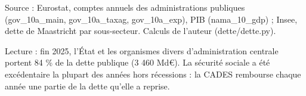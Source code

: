 Source : Eurostat, comptes annuels des administrations publiques (gov\_10a\_main, gov\_10a\_taxag, gov\_10a\_exp), PIB (nama\_10\_gdp) ; Insee, dette de Maastricht par sous-secteur. Calculs de l'auteur (dette/dette.py).\par Lecture : fin 2025, l'État et les organismes divers d'administration centrale portent 84 \% de la dette publique (3 460 Md\euro{}). La sécurité sociale a été excédentaire la plupart des années hors récessions : la CADES rembourse chaque année une partie de la dette qu'elle a reprise.

